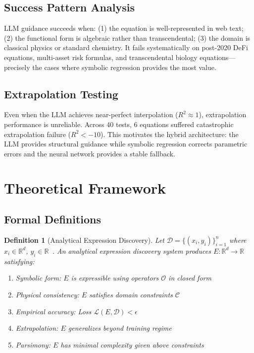\documentclass[twoside,11pt]{article}
\newcommand{\Rsq}{R^{2}}
\newtheorem{definition}[theorem]{Definition}
\begin{document}
\subsection{Success Pattern Analysis}

LLM guidance succeeds when: (1) the equation is well-represented in web text; (2) the functional form is algebraic rather than transcendental; (3) the domain is classical physics or standard chemistry. It fails systematically on post-2020 DeFi equations, multi-asset risk formulas, and transcendental biology equations---precisely the cases where symbolic regression provides the most value.

\subsection{Extrapolation Testing}

Even when the LLM achieves near-perfect interpolation ($\Rsq \approx 1$), extrapolation performance is unreliable. Across 40 tests, 6 equations suffered catastrophic extrapolation failure ($\Rsq < -10$). This motivates the hybrid architecture: the LLM provides structural guidance while symbolic regression corrects parametric errors and the neural network provides a stable fallback.

\section{Theoretical Framework}
\label{sec:theory}

\subsection{Formal Definitions}

\begin{definition}[Analytical Expression Discovery]
Let $\mathcal{D} = \{(x_i, y_i)\}_{i=1}^n$ where $x_i \in \mathbb{R}^d$, $y_i \in \mathbb{R}$~\citep{udrescu2020feynman}. An analytical expression discovery system produces $E: \mathbb{R}^d \to \mathbb{R}$ satisfying:
\begin{enumerate}
  \item \textit{Symbolic form}: $E$ is expressible using operators $\mathcal{O}$ in closed form
  \item \textit{Physical consistency}: $E$ satisfies domain constraints $\mathcal{C}$
  \item \textit{Empirical accuracy}: Loss $\mathcal{L}(E, \mathcal{D}) < \epsilon$
  \item \textit{Extrapolation}: $E$ generalizes beyond training regime
  \item \textit{Parsimony}: $E$ has minimal complexity given above constraints
\end{enumerate}
\end{definition}
\end{document}

